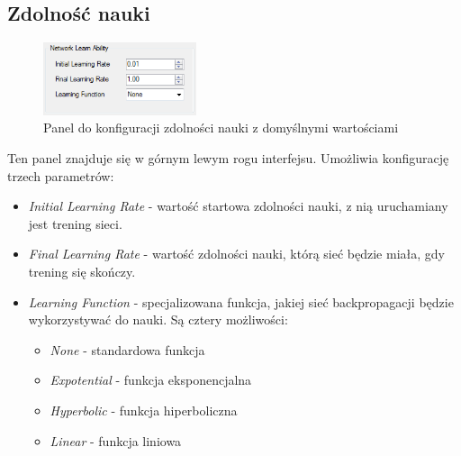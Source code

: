 \documentclass[a4paper]{article}
\begin{document}
			\subsection{Zdolność nauki}
				\begin{figure}[h!]
					\centering
					\includegraphics[width=0.40\textwidth]{./img/GUI_initial_learning}
					\caption{Panel do konfiguracji zdolności nauki z domyślnymi wartościami}
				\end{figure}\indent
				Ten panel znajduje się w górnym lewym rogu interfejsu. Umożliwia konfigurację trzech parametrów:
				\begin{itemize}
					\item \emph{Initial Learning Rate} - wartość startowa zdolności nauki, z nią uruchamiany jest trening sieci.
					\item \emph{Final Learning Rate} - wartość zdolności nauki, którą sieć będzie miała, gdy trening się skończy.
					\item \emph{Learning Function} - specjalizowana funkcja, jakiej sieć backpropagacji będzie wykorzystywać do nauki. Są cztery możliwości:
					\begin{itemize}
						\item \emph{None} - standardowa funkcja
						\item \emph{Expotential} - funkcja eksponencjalna
						\item \emph{Hyperbolic} - funkcja hiperboliczna
						\item \emph{Linear} - funkcja liniowa
					\end{itemize}
				\end{itemize}
\end{document}
